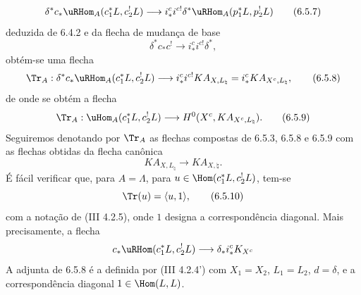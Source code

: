 \begin{equation}
\delta^*c_*\uRHom_A(c_1^*L,c_2^!L)
\longrightarrow
i_*^ci^{c!}\delta^*\uRHom_A(p_1^*L,p_2^!L)
\tag{6.5.7}
\end{equation}
deduzida de 6.4.2 e da flecha de mudança de base
\[
\delta^*c_*c^!\longrightarrow i_*^ci^{c!}\delta^*,
\]
obtém-se uma flecha
\begin{equation}
\Tr_A:\delta^*c_*\uRHom_A(c_1^*L,c_2^!L)
\longrightarrow
i_*^ci^{c!}KA_{X,L_{\natural}}
=i_*^cKA_{X^c,L_{\natural}},
\tag{6.5.8}
\end{equation}
de onde se obtém a flecha
\begin{equation}
\Tr_A:\uHom_A(c_1^*L,c_2^!L)
\longrightarrow
H^0(X^c,KA_{X^c,L_{\natural}}).
\tag{6.5.9}
\end{equation}
Seguiremos denotando por $\Tr_A$ as flechas compostas de 6.5.3, 6.5.8 e 6.5.9 com as flechas obtidas da flecha canônica
\[
KA_{X,L_{\natural}}\longrightarrow KA_{X,\natural}.
\]
É fácil verificar que, para $A=\Lambda$, para $u\in\Hom(c_1^*L,c_2^!L)$, tem-se
\begin{equation}
\Tr(u)=\langle u,1\rangle,
\tag{6.5.10}
\end{equation}
com a notação de (III 4.2.5), onde $1$ designa a correspondência diagonal. Mais precisamente, a flecha
\[
c_*\uRHom(c_1^*L,c_2^!L)\longrightarrow \delta_*i_*^cK_{X^c}
\]
A adjunta de 6.5.8 é a definida por (III 4.2.4') com $X_1=X_2$, $L_1=L_2$, $d=\delta$, e a correspondência diagonal $1\in\Hom(L,L)$.
